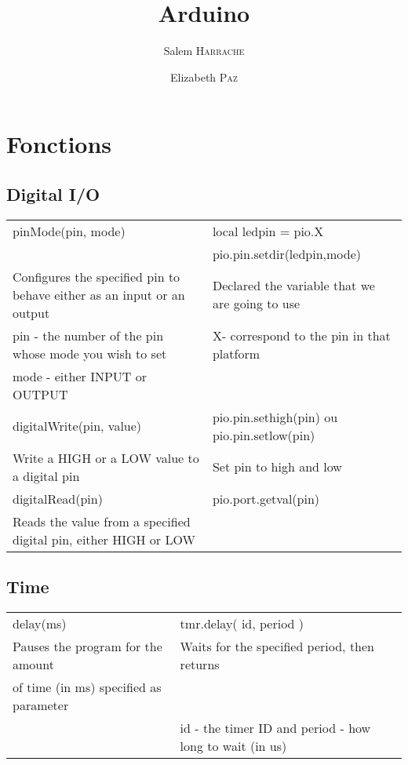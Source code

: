 \documentclass[a4paper,10pt]{article}
\title{Arduino}
\author{Salem \textsc{Harrache} \and Elizabeth \textsc{Paz}}
\date{}
\begin{document}
\maketitle
\section{Fonctions}

\subsection{Digital I/O}

\begin{tabular}{|l|l|}
\hline
pinMode(pin, mode) & local ledpin = pio.X \\
 & pio.pin.setdir(ledpin,mode) \\ \hline \hline
Configures the specified pin to behave either as an input or an output & Declared the variable that we are going to use \\
pin - the number of the pin whose mode you wish to set & X- correspond to the pin in that platform \\
mode - either INPUT or OUTPUT & \\ \hline

digitalWrite(pin, value) & pio.pin.sethigh(pin) ou pio.pin.setlow(pin) \\
Write a HIGH or a LOW value to a digital pin  & Set pin to high and low \\ \hline

digitalRead(pin) & pio.port.getval(pin) \\ 
Reads the value from a specified digital pin, either HIGH or LOW &  \\ \hline
\hline \end{tabular}

\subsection{Time}

\begin{tabular}{|l|l|} \hline
delay(ms) & tmr.delay( id, period )\\
Pauses the program for the amount  & Waits for the specified period, then returns \\ 
of time (in ms) specified as parameter & \\
&  id - the timer ID and period - how long to wait (in us)\\
\hline \end{tabular}
\end{document}
